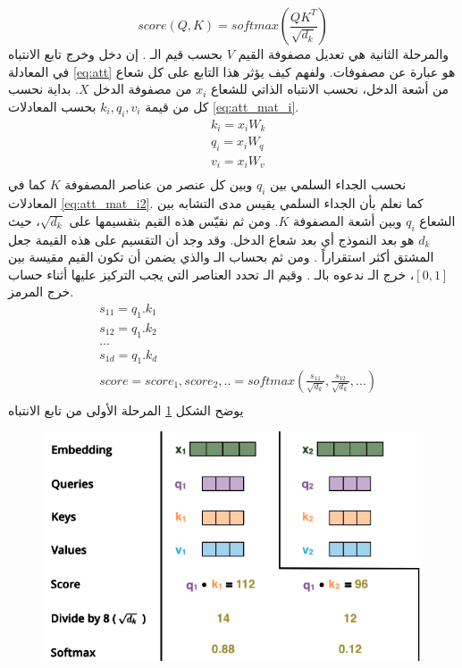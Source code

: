 \begin{equation}
score(Q,K) = softmax(\frac{QK^T}{\sqrt{d_k}})
\end{equation}
والمرحلة الثانية هي تعديل مصفوفة القيم
$V$
بحسب قيم الـ
.
إن دخل وخرج تابع الانتباه في المعادلة
\ref{eq:att}
هو عبارة عن مصفوفات.
\newline
ولفهم كيف يؤثر هذا التابع على كل شعاع
من أشعة الدخل،
نحسب الانتباه الذاتي للشعاع
$x_i$
من مصفوفة الدخل 
$X$.
بداية نحسب كل من قيمة
$k_i,q_i,v_i$
بحسب المعادلات
\ref{eq:att_mat_i}.
\begin{equation}
\begin{split}
&k_i = x_i W_k\\
&q_i = x_i W_q\\
&v_i = x_i W_v\\
\end{split}
\label{eq:att_mat_i}
\end{equation}
نحسب الجداء السلمي بين
$q_i$
وبين كل عنصر من عناصر المصفوفة
$K$ 
كما في المعادلات
\ref{eq:att_mat_i2}.
كما نعلم بأن الجداء السلمي يقيس مدى التشابه بين الشعاع
$q_i$
وبين أشعة المصفوفة
$K$.
ومن ثم نقيّس هذه القيم بتقسيمها على
$\sqrt{d_k}$،
حيث 
$d_k$
هو بعد النموذج 
أي بعد شعاع الدخل.
وقد وجد أن التقسيم على هذه القيمة جعل المشتق أكثر استقراراً
.
ومن ثم بحساب الـ
والذي يضمن أن تكون القيم مقيسة بين
$[0,1]$،
خرج الـ
ندعوه بالـ
.
 وقيم الـ
تحدد العناصر التي يجب التركيز عليها أثناء حساب خرج المرمز.
\begin{equation}
	\begin{split}
	&s_{11} = q_1.k_1\\
	&s_{12} = q_1.k_2\\
	&...\\
	&s_{1d} = q_1.k_d\\
	&score =score_1,score_2,..= softmax(\frac{s_{11}}{\sqrt{d_k}},\frac{s_{12}}{\sqrt{d_k}},...)\\
	\end{split}
	\label{eq:att_mat_i2}
\end{equation}
يوضح الشكل 
\ref{fig:att_score}
المرحلة الأولى من تابع الانتباه
\begin{figure}[H]
	\centerline{\includegraphics[scale=0.4]{images/att_score}}
	\caption{
		}
	\label{fig:att_score}
\end{figure}
